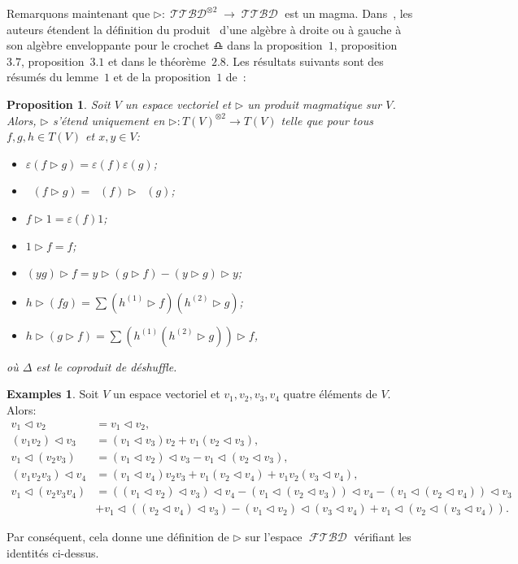 \documentclass[french]{article}
\theoremstyle{definition}
\newtheorem{Egs}{\textbf{Examples}}[section]
\theoremstyle{plain}
\newtheorem{Prop}[defi]{Proposition}
\newcommand{\e}{\varepsilon}
\DeclareMathOperator{\Dsh}{{\Delta_{\shuffle}}}
\DeclareMathOperator{\FTBD}{\mathcal{FTBD}}
\DeclareMathOperator{\TTBD}{\mathcal{TTBD}}
\begin{document}
Remarquons maintenant que $\rhd:\TTBD^{\otimes 2} \rightarrow \TTBD$ est un magma.
Dans~\cite{siso,FreePL,EnvPost,LPostLie}, les auteurs étendent la définition du produit~\PL{}  d'une algèbre \PL{} à droite ou à gauche à son algèbre enveloppante pour le crochet $\libra{}{}$ dans la proposition~$1$, proposition~$3.7$, proposition~$3.1$ et dans le théorème~$2.8$. Les résultats suivants sont des résumés du lemme~$1$ et de la proposition~$1$ de~\cite{siso}:
\begin{Prop}\label{Prop:extendTg}
	Soit $V$ un espace vectoriel et $\rhd$ un produit magmatique sur $V$. Alors, $\rhd$ s'étend uniquement en $\rhd:T(V)^{\otimes 2}\rightarrow T(V)$ telle que pour tous $f,g,h\in T(V)$ et $x,y\in V$:	
	\begin{itemize}
		\item $\e(f\rhd g)=\e(f)\e(g)$;
		\item $\Dsh(f\rhd g)=\Dsh(f)\rhd \Dsh(g)$;
		\item $f\rhd 1=\e(f)1$;
		\item $1\rhd f=f$;
		\item $(yg)\rhd f=y\rhd (g\rhd f)-(y\rhd g)\rhd y$;
		\item $h\rhd (fg)=\sum \left(h^{(1)}\rhd f\right)\left( h^{(2)}\rhd g \right)$;
		\item $h\rhd (g\rhd f)= \sum \left(h^{(1)}\left(h^{(2)}\rhd g\right)\right)\rhd f$,
	\end{itemize}
	où $\Delta$ est le coproduit de déshuffle.
\end{Prop}
\begin{Egs}
	Soit $V$ un espace vectoriel et $v_1,v_2,v_3,v_4$ quatre éléments de $V$. Alors:
	\begin{align*}
		v_1\lhd v_2&=v_1\lhd v_2, \\
		(v_1v_2)\lhd v_3&=(v_1\lhd  v_3)v_2 +v_1(v_2\lhd  v_3), \\
		v_1\lhd (v_2v_3)&=(v_1\lhd  v_2)\lhd  v_3-v_1\lhd  (v_2\lhd  v_3), \\
		(v_1v_2v_3)\lhd v_4&=(v_1\lhd  v_4)v_2v_3+v_1(v_2\lhd  v_4)+v_1v_2(v_3\lhd  v_4), \\
		v_1\lhd (v_2v_3v_4)&=((v_1\lhd  v_2)\lhd  v_3)\lhd  v_4-(v_1\lhd  (v_2\lhd  v_3))\lhd  v_4-(v_1\lhd  (v_2\lhd  v_4))\lhd  v_3 \\&+v_1\lhd  ((v_2\lhd  v_4)\lhd  v_3) -(v_1\lhd  v_2)\lhd  (v_3\lhd  v_4)+v_1\lhd  (v_2\lhd  (v_3\lhd  v_4)).
	\end{align*}
\end{Egs}

Par conséquent, cela donne une définition de $\rhd$ sur l'espace $\FTBD$ vérifiant les identités ci-dessus.
\end{document}
